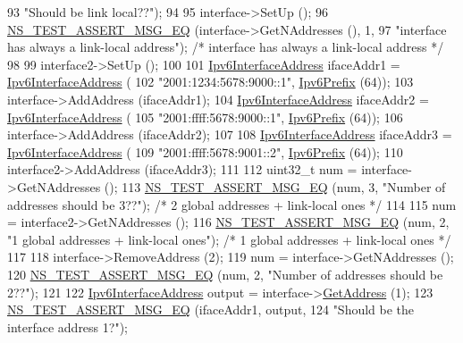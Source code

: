 \begin{DoxyCode}
93                          \textcolor{stringliteral}{"Should be link local??"});
94 
95   interface->SetUp ();
96   \hyperlink{group__testing_ga2a9d78cffb3db8e867c35fff0b698cf5}{NS\_TEST\_ASSERT\_MSG\_EQ} (interface->GetNAddresses (), 1,
97                          \textcolor{stringliteral}{"interface has always a link-local address"}); \textcolor{comment}{/* interface has always a link-local
       address */}
98 
99   interface2->SetUp ();
100 
101   \hyperlink{classns3_1_1Ipv6InterfaceAddress}{Ipv6InterfaceAddress} ifaceAddr1 = \hyperlink{classns3_1_1Ipv6InterfaceAddress}{Ipv6InterfaceAddress} (
102       \textcolor{stringliteral}{"2001:1234:5678:9000::1"}, \hyperlink{classns3_1_1Ipv6Prefix}{Ipv6Prefix} (64));
103   interface->AddAddress (ifaceAddr1);
104   \hyperlink{classns3_1_1Ipv6InterfaceAddress}{Ipv6InterfaceAddress} ifaceAddr2 = \hyperlink{classns3_1_1Ipv6InterfaceAddress}{Ipv6InterfaceAddress} (
105       \textcolor{stringliteral}{"2001:ffff:5678:9000::1"}, \hyperlink{classns3_1_1Ipv6Prefix}{Ipv6Prefix} (64));
106   interface->AddAddress (ifaceAddr2);
107 
108   \hyperlink{classns3_1_1Ipv6InterfaceAddress}{Ipv6InterfaceAddress} ifaceAddr3 = \hyperlink{classns3_1_1Ipv6InterfaceAddress}{Ipv6InterfaceAddress} (
109       \textcolor{stringliteral}{"2001:ffff:5678:9001::2"}, \hyperlink{classns3_1_1Ipv6Prefix}{Ipv6Prefix} (64));
110   interface2->AddAddress (ifaceAddr3);
111 
112   uint32\_t num = interface->GetNAddresses ();
113   \hyperlink{group__testing_ga2a9d78cffb3db8e867c35fff0b698cf5}{NS\_TEST\_ASSERT\_MSG\_EQ} (num, 3, \textcolor{stringliteral}{"Number of addresses should be 3??"}); \textcolor{comment}{/* 2 global
       addresses + link-local ones */}
114 
115   num = interface2->GetNAddresses ();
116   \hyperlink{group__testing_ga2a9d78cffb3db8e867c35fff0b698cf5}{NS\_TEST\_ASSERT\_MSG\_EQ} (num, 2, \textcolor{stringliteral}{"1 global addresses + link-local ones"}); \textcolor{comment}{/* 1 global
       addresses + link-local ones */}
117 
118   interface->RemoveAddress (2);
119   num = interface->GetNAddresses ();
120   \hyperlink{group__testing_ga2a9d78cffb3db8e867c35fff0b698cf5}{NS\_TEST\_ASSERT\_MSG\_EQ} (num, 2, \textcolor{stringliteral}{"Number of addresses should be 2??"});
121 
122   \hyperlink{classns3_1_1Ipv6InterfaceAddress}{Ipv6InterfaceAddress} output = interface->\hyperlink{classns3_1_1Ipv6InterfaceAddress_a80d4caacff72bddc3045a5929519e107}{GetAddress} (1);
123   \hyperlink{group__testing_ga2a9d78cffb3db8e867c35fff0b698cf5}{NS\_TEST\_ASSERT\_MSG\_EQ} (ifaceAddr1, output,
124                          \textcolor{stringliteral}{"Should be the interface address 1?"});

\end{DoxyCode}
